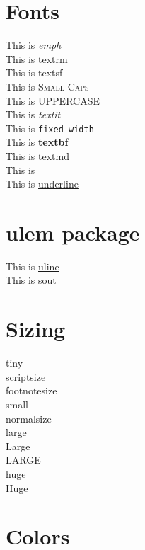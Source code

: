 \documentclass{article}
\begin{document}

  \section{Fonts}

  This is \emph{emph} \\
  This is \textrm{textrm} \\
  This is \textsf{textsf} \\
  This is \textsc{Small Caps} \\
  This is \uppercase{uPpeRcAsE} \\
  This is \textit{textit} \\
  This is \texttt{fixed width} \\
  This is \textbf{textbf} \\
  This is \textmd{textmd} \\
  This is  \\
  This is \underline{underline} \\

  \section{ulem package}

  This is \uline{uline} \\
  This is \sout{sout} \\

  \section{Sizing}

  {\tiny tiny} \\
  {\scriptsize scriptsize} \\
  {\footnotesize footnotesize} \\
  {\small small} \\
  {\normalsize normalsize} \\
  {\large large} \\
  {\Large Large} \\
  {\LARGE LARGE} \\
  {\huge huge} \\
  {\Huge Huge} \\

  \section{Colors}
\end{document}
